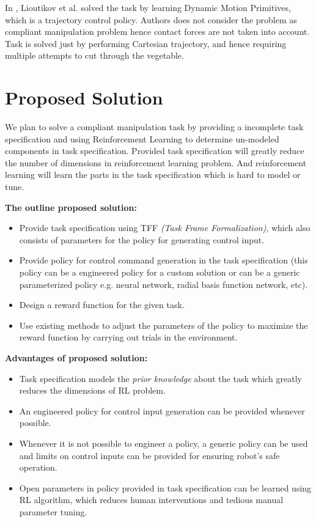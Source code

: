 \documentclass[thesis]{mas_proposal}
\begin{document}
In \cite{lioutikov2016learning}, Lioutikov et al. solved the task by learning Dynamic Motion Primitives, which is a trajectory control policy. Authors does not consider the problem as compliant manipulation problem hence contact forces are not taken into account. Task is solved just by performing Cartesian trajectory, and hence requiring multiple attempts to cut through the vegetable. 


\chapter{Proposed Solution}

We plan to solve a compliant manipulation task by providing a incomplete task specification and using Reinforcement Learning to determine un-modeled components in task specification. Provided task specification will greatly reduce the number of dimensions in reinforcement learning problem. And reinforcement learning will learn the parts in the task specification which is hard to model or tune.



\textbf{The outline proposed solution:}
\begin{itemize}
	\item Provide task specification using TFF \textit{(Task Frame Formalization)}\cite{mason1981compliance}, which also consists of parameters for the policy for generating control input.
	\item Provide policy for control command generation in the task specification (this policy can be a engineered policy for a custom solution or can be a generic parameterized policy e.g. neural network, radial basis function network, etc).
	\item Design a reward function for the given task.
	\item Use existing methods to adjust the parameters of the policy to maximize the reward function by carrying out trials in the environment.
\end{itemize}

\textbf{Advantages of proposed solution:}
\begin{itemize}
	\item Task specification models the \textit{prior knowledge} about the task which greatly reduces the dimensions of RL problem.
	\item An engineered policy for control input generation can be provided whenever possible. 
	\item Whenever it is not possible to engineer a policy, a generic policy can be used and limits on control inputs can be provided for ensuring robot's safe operation.
	\item Open parameters in policy provided in task specification can be learned using RL algorithm, which reduces human interventions and tedious manual parameter tuning. 

\end{itemize}
\end{document}
